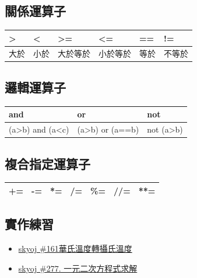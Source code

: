 \documentclass[a4paper,12pt]{article}
\begin{document}
\subsection{關係運算子}
\label{sec:orgcccb09d}
\begin{center}
\begin{tabular}{llllll}
\hline
> & < & >= & <= & == & !=\\
\hline
大於 & 小於 & 大於等於 & 小於等於 & 等於 & 不等於\\
\hline
\end{tabular}
\end{center}

\subsection{邏輯運算子}
\label{sec:org869a4c5}
\begin{center}
\begin{tabular}{lll}
\hline
and & or & not\\
\hline
(a>b) and (a<c) & (a>b) or (a==b) & not (a>b)\\
\hline
\end{tabular}
\end{center}

\subsection{複合指定運算子}
\label{sec:org41c826b}
\begin{center}
\begin{tabular}{lllllll}
\hline
+= & -= & *= & /= & \%= & //= & **=\\
\hline
\end{tabular}
\end{center}

\subsection{實作練習}
\label{sec:org86e65fc}
\begin{itemize}
\item \href{http://skyoj.tnfsh.tn.edu.tw/sky/index.php/problem/view/161/}{skyoj \#161華氏溫度轉攝氏溫度}\\
\item \href{http://skyoj.tnfsh.tn.edu.tw/sky/index.php/problem/view/277/}{skyoj \#277. 一元二次方程式求解}\\
\end{itemize}

\newpage
\end{document}
